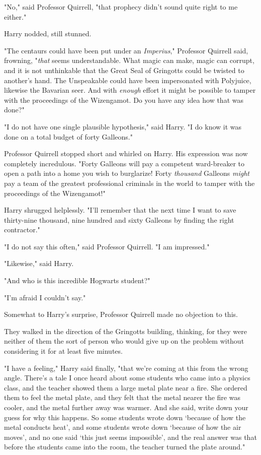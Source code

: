 "No," said Professor Quirrell, "that prophecy didn't sound quite right to me 
either."

Harry nodded, still stunned.

"The centaurs could have been put under an \emph{Imperius}," Professor Quirrell 
said, frowning, "\emph{that} seems understandable. What magic can make, magic 
can corrupt, and it is not unthinkable that the Great Seal of Gringotts could 
be twisted to another's hand. The Unspeakable could have been impersonated with 
Polyjuice, likewise the Bavarian seer. And with \emph{enough} effort it might 
be possible to tamper with the proceedings of the Wizengamot. Do you have any 
idea how that was done?"

"I do not have one single plausible hypothesis," said Harry. "I do know it was 
done on a total budget of forty Galleons."

Professor Quirrell stopped short and whirled on Harry. His expression was now 
completely incredulous. "Forty Galleons will pay a competent ward-breaker to 
open a path into a home you wish to burglarize! Forty \emph{thousand} Galleons 
\emph{might} pay a team of the greatest professional criminals in the world to 
tamper with the proceedings of the Wizengamot!"

Harry shrugged helplessly. "I'll remember that the next time I want to save 
thirty-nine thousand, nine hundred and sixty Galleons by finding the right 
contractor."

"I do not say this often," said Professor Quirrell. "I am impressed."

"Likewise," said Harry.

"And who is this incredible Hogwarts student?"

"I'm afraid I couldn't say."

Somewhat to Harry's surprise, Professor Quirrell made no objection to this.

They walked in the direction of the Gringotts building, thinking, for they were 
neither of them the sort of person who would give up on the problem without 
considering it for at least five minutes.

"I have a feeling," Harry said finally, "that we're coming at this from the 
wrong angle. There's a tale I once heard about some students who came into a 
physics class, and the teacher showed them a large metal plate near a fire. She 
ordered them to feel the metal plate, and they felt that the metal nearer the 
fire was cooler, and the metal further away was warmer. And she said, write 
down your guess for why this happens. So some students wrote down `because of 
how the metal conducts heat', and some students wrote down `because of how the 
air moves', and no one said `this just seems impossible', and the real answer 
was that before the students came into the room, the teacher turned the plate 
around."

